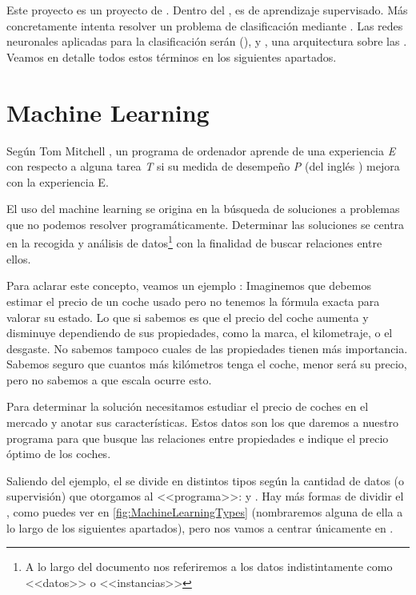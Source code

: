

Este proyecto es un proyecto de . Dentro del , es de aprendizaje supervisado. Más concretamente intenta resolver un problema de clasificación mediante . Las redes neuronales aplicadas para la clasificación serán  (), y , una arquitectura sobre las . Veamos en detalle todos estos términos en los siguientes apartados.

\section{Machine Learning}

Según Tom Mitchell , un programa de ordenador aprende de una experiencia \textit{E} con respecto a alguna tarea \textit{T} si su medida de desempeño \textit{P} (del inglés ) mejora con la experiencia E.

El uso del machine learning se origina en la búsqueda de soluciones a problemas que no podemos resolver programáticamente. Determinar las soluciones se centra en la recogida y análisis de datos\footnote{A lo largo del documento nos referiremos a los datos indistintamente como <<datos>> o <<instancias>>} con la finalidad de buscar relaciones entre ellos.

Para aclarar este concepto, veamos un ejemplo \label{example:car_price}:
Imaginemos que debemos estimar el precio de un coche usado pero no tenemos la fórmula exacta para valorar su estado. Lo que si sabemos es que el precio del coche aumenta y disminuye dependiendo de sus propiedades, como la marca, el kilometraje, o el desgaste. No sabemos tampoco cuales de las propiedades tienen más importancia. Sabemos seguro que cuantos más kilómetros tenga el coche, menor será su precio, pero no sabemos a que escala ocurre esto.

Para determinar la solución necesitamos estudiar el precio de coches en el mercado y anotar sus características. Estos datos son los que daremos a nuestro programa para que busque las relaciones entre propiedades e indique el precio óptimo de los coches.

Saliendo del ejemplo, el  se divide en distintos tipos según la cantidad de datos (o supervisión) que otorgamos al <<programa>>:  y . Hay más formas de dividir el , como puedes ver en \ref{fig:MachineLearningTypes} (nombraremos alguna de ella a lo largo de los siguientes apartados), pero nos vamos a centrar únicamente en .


